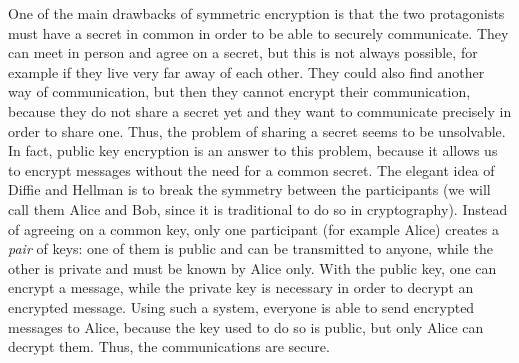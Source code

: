 One of the main drawbacks of symmetric encryption is that the two
protagonists must have a secret in common in order to be able to securely
communicate. They can meet in person and agree on a secret, but this is not
always possible, for example if they live very far away of each other. They
could also find another way of communication, but then they cannot encrypt their
communication, because they do not share a secret yet and they want to
communicate precisely in order to share one. Thus, the problem of sharing a
secret seems to be unsolvable. In fact, public key encryption is an answer to
this problem, because it allows us to encrypt messages without the need for a
common secret. The elegant idea of Diffie and Hellman is to break the symmetry
between the participants (we will call them Alice and Bob, since it is
traditional to do so in cryptography). Instead of agreeing on a common key, only
one participant (for example Alice) creates a \emph{pair} of keys: one of them
is public and can be transmitted to anyone, while the other is private and must
be known by Alice only. With the public key, one can encrypt a message, while
the private key is necessary in order to decrypt an encrypted message. Using
such a system, everyone is able to send encrypted messages to Alice, because the
key used to do so is public, but only Alice can decrypt them. Thus, the
communications are secure.
